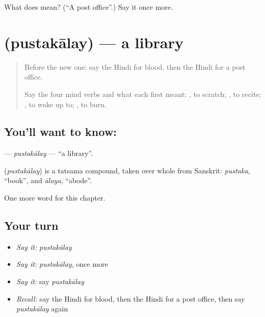 \begin{tcolorbox}[breakable,colback=teal!4,colframe=teal!35!black,title={Before you move on}]
What does  mean? (\textquotedblleft{}A post office\textquotedblright{}.) Say it once more.
\end{tcolorbox}
\section[\texorpdfstring{\hi{पुस्तकालय} (pustakālay)}{पुस्तकालय (pustakālay)}]{ (pustakālay) — a library}

\label{lesson:HI-C152-pustakalay}



\begin{quote}
Before the new one: say the Hindi for blood, then the Hindi for a post office.

Say the four mind verbs and what each first meant: \textbf{}, to scratch; \textbf{}, to recite; \textbf{}, to wake up to; \textbf{}, to burn.
\end{quote}

\subsection*{You'll want to know: }
\textbf{} — \emph{pustakālay} — \textquotedblleft{}a library\textquotedblright{}.

\begin{cousinweb}
\textbf{} (\emph{pustakālay}) is a tatsama compound, taken over whole from Sanskrit: \emph{pustaka}, \textquotedblleft{}book\textquotedblright{}, and \emph{ālaya}, \textquotedblleft{}abode\textquotedblright{}.
\end{cousinweb}

\begin{grammarlens}[title={What you've built}]
One more word for this chapter.
\end{grammarlens}

\subsection*{Your turn}
\begin{itemize}
\raggedright
  \item \emph{Say it:} \emph{pustakālay}
  \item \emph{Say it:} \emph{pustakālay}, once more
  \item \emph{Say it:} say \emph{pustakālay}
  \item \emph{Recall:} say the Hindi for blood, then the Hindi for a post office, then say \emph{pustakālay} again
\end{itemize}


